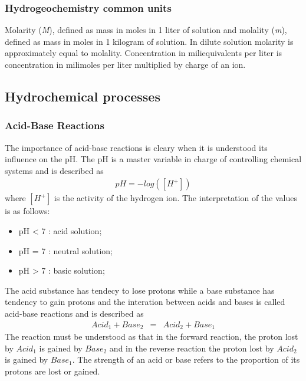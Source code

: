\documentclass[ppgc,mestrado,english]{iiufrgs}
\begin{document}
\subsubsection{Hydrogeochemistry common units}
Molarity (\emph{M}), defined as mass in moles in 1 liter of solution and molality (\emph{m}), defined as mass in moles in 1 kilogram of solution. In dilute solution molarity is approximately equal to molality. Concentration in miliequivalents per liter is concentration in milimoles per liter multiplied by charge of an ion.

\subsection{Hydrochemical processes}

\subsubsection{Acid-Base Reactions}
The importance of acid-base reactions is cleary when it is understood its influence on the pH. The pH is a master variable in charge of controlling chemical systems and is described as
\begin{eqnarray}
pH = - log([H^+])
\end{eqnarray}
where $[H^+]$ is the activity of the hydrogen ion. The interpretation of the values is as follows:
\begin{itemize}
\item pH < 7 : acid solution;
\item pH = 7 : neutral solution;
\item pH > 7 : basic solution;
\end{itemize}
The acid substance has tendecy to lose protons while a base substance has tendency to gain protons and the interation between acids and bases is called acid-base reactions and is described as
\begin{eqnarray}
Acid_1 + Base_2 &=& Acid_2 + Base_1
\end{eqnarray}
The reaction must be understood as that in the forward reaction, the proton lost by $Acid_1$ is gained by $Base_2$ and in the reverse reaction the proton lost by $Acid_2$ is gained by $Base_1$.  The strength of an acid or base refers to the proportion of its protons are lost or gained. 

\end{document}
